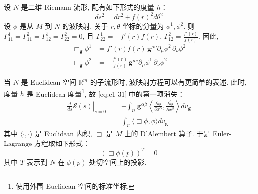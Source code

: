 \begin{example*}
设 $N$ 是二维 Riemann 流形, 配有如下形式的度量 $h$：
\[
ds^2 = dr^2 + f(r)^2d\theta^2
\]
设 $\phi$ 是从 $M$ 到 $N$ 的波映射, 关于 $r, \theta$ 坐标的分量为 $\phi^1, \phi^2$. 则 $\Gamma^1_{11} = \Gamma^2_{11} = \Gamma^1_{12} = \Gamma^2_{22} = 0$, 且 $\Gamma^1_{22} = -f'(r)f(r)$, $\Gamma^2_{12} = \frac{f'(r)}{f(r)}$. 因此, 
\[
\begin{aligned}
\Box_{\mathbf{g}}\phi^1 &= f'(r)f(r)\, \mathbf{g}^{\mu\nu}\partial_\mu\phi^2\, \partial_\nu\phi^2\\
\Box_{\mathbf{g}}\phi^2 &= -\frac{f'(r)}{f(r)}\, \mathbf{g}^{\mu\nu}\partial_\mu\phi^1\, \partial_\nu\phi^2
\end{aligned}
\]
\end{example*}

当 $N$ 是 Euclidean 空间 $\mathbb{R}^m$ 的子流形时, 波映射方程可以有更简单的表述. 此时, 度量 $h$ 是 Euclidean 度量\footnote{使用外围 Euclidean 空间的标准坐标. }, 故 \eqref{eq:c1-31} 中的第一项消失：
\[
\begin{aligned}
\left.\frac{d}{ds}\mathcal{S}(s)\right|_{s=0} &= -\int_{\mathcal{U}}\mathbf{g}^{\alpha\beta}\left\langle\frac{\partial\phi}{\partial x^\alpha}, \frac{\partial\dot{\phi}}{\partial x^\beta}\right\rangle dv_{\mathbf{g}}\\
&= \int_{\mathcal{U}}\langle\Box\phi, \dot{\phi}\rangle dv_{\mathbf{g}}
\end{aligned}
\]
其中 $\langle\cdot, \cdot\rangle$ 是 Euclidean 内积, $\Box$ 是 $M$ 上的 D'Alembert 算子. 于是 Euler-Lagrange 方程取如下形式：
\begin{equation}
(\Box\phi(p))^T = 0\label{eq:c1-34}
\end{equation}
其中 $T$ 表示到 $N$ 在 $\phi(p)$ 处切空间上的投影. 

